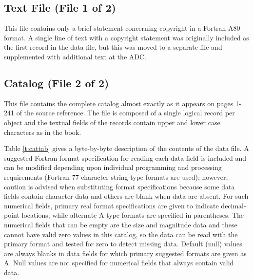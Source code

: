 \subsection{Text File (File 1 of 2)}
\label{s:cathdi}

This file contains only a brief statement concerning copyright in a Fortran A80
format. A single line of text with a copyright statement was originally included
as the first record in the data file, but this was moved to a separate file and
supplemented with additional text at the ADC.

\subsection{Catalog (File 2 of 2)}
\label{s:cathdc}

This file contains the complete catalog almost exactly as it appears on pages
1-241 of the source reference. The file is composed of a single logical record
per object and the textual fields of the records contain upper and lower case
characters as in the book.

Table \ref{t:cattab} gives a byte-by-byte description of the contents of the
data file. A suggested Fortran format specification for reading each data field
is included and can be modified depending upon individual programming and
processing requirements (Fortran 77 character string-type formats are used);
however, caution is advised when substituting format specifications because some
data fields contain character data and others are blank when data are absent.
For such numerical fields, primary real format specifications are given to
indicate decimal-point locations, while alternate A-type formats are specified
in parentheses. The numerical fields that can be empty are the size and
magnitude data and these cannot have valid zero values in this catalog, so the
data can be read with the primary format and tested for zero to detect missing
data. Default (null) values are always blanks in data fields for which primary
suggested formats are given as A. Null values are not specified for numerical
fields that always contain valid data.


